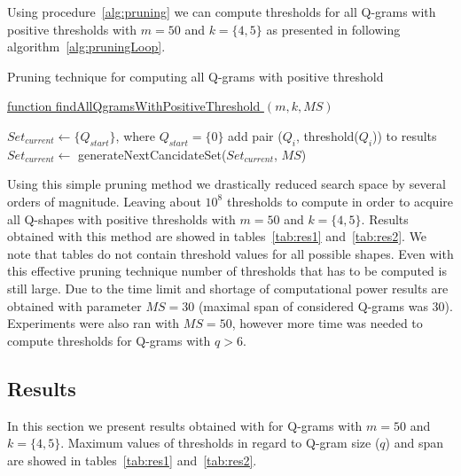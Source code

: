 \documentclass[paper=a4, fontsize=11pt]{scrartcl} %
\numberwithin{equation}{section} %
\numberwithin{figure}{section} %
\numberwithin{table}{section} %
\begin{document}
Using procedure~\ref{alg:pruning} we can compute thresholds for all Q-grams with
positive thresholds with $m=50$ and $k=\{4,5\}$ as presented in following
algorithm~\ref{alg:pruningLoop}.

\begin{algorithm}[H]
\caption{Pruning technique for computing all Q-grams with positive threshold}
\label{alg:pruningLoop}

\underline{function findAllQgramsWithPositiveThreshold } $(m,k,MS)$\;



\begin{algorithmic}
	\STATE $Set_{current} \gets \{Q_{start}\}$, where $Q_{start} = \{0\}$
			\STATE add pair ($Q_{i}$, threshold($Q_{i}$)) to results
			\ENDIF
			\STATE $Set_{current} \gets$ generateNextCancidateSet($Set_{current}$, $MS$)
		\ENDFOR	
\end{algorithmic}

\end{algorithm}

Using this simple pruning method we drastically reduced search space by several
orders of magnitude. Leaving about $10^{8}$ thresholds to compute in order to
acquire all Q-shapes with positive thresholds with $m=50$ and $k=\{4,5\}$.
Results obtained with this method are showed in tables~\ref{tab:res1}
and~\ref{tab:res2}. 
We note that tables do not contain threshold values for all
possible shapes. Even with this effective pruning technique number of thresholds
that has to be computed is still large. Due to the time limit and
shortage of computational power results are obtained with parameter $MS = 30$
(maximal span of considered Q-grams was $30$). Experiments were also ran with
$MS = 50$, however more time was needed to compute thresholds for Q-grams
with $q > 6$.


\subsection{Results}

In this section we present results obtained with for Q-grams with $m=50$ and
$k=\{4,5\}$. Maximum values of thresholds in regard to Q-gram size ($q$) and
span are showed in tables~\ref{tab:res1} and~\ref{tab:res2}.
\end{document}
